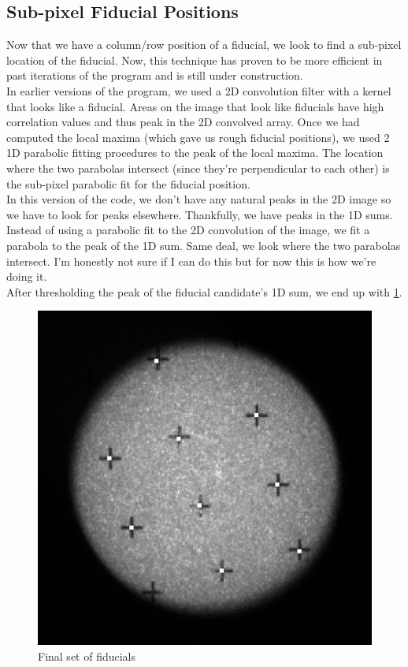 \documentclass[10pt]{scrartcl}
\begin{document}
\subsection{Sub-pixel Fiducial Positions} %
\label{sub:sub_pixel_fiducial_positions}

Now that we have a column/row position of a fiducial, we look to find a sub-pixel location of the fiducial. Now, this technique has proven to be more efficient in past iterations of the program and is still under construction.\\
\indent In earlier versions of the program, we used a 2D convolution filter with a kernel that looks like a fiducial. Areas on the image that look like fiducials have high correlation values and thus peak in the 2D convolved array. Once we had computed the local maxima (which gave us rough fiducial positions), we used 2 1D parabolic fitting procedures to the peak of the local maxima. The location where the two parabolas intersect (since they're perpendicular to each other) is the sub-pixel parabolic fit for the fiducial position.\\
\indent In this version of the code, we don't have any natural peaks in the 2D image so we have to look for peaks elsewhere. Thankfully, we have peaks in the 1D sums. Instead of using a parabolic fit to the 2D convolution of the image, we fit a parabola to the peak of the 1D sum. Same deal, we look where the two parabolas intersect. I'm honestly not sure if I can do this but for now this is how we're doing it.\\
\indent After thresholding the peak of the fiducial candidate's 1D sum, we end up with \cref{fiddone}.

\begin{figure}[!ht]
    \centering
    \includegraphics[width=.9\textwidth]{../plots_tables_images/fiddone.eps}
    \caption{Final set of fiducials}
    \label{fiddone}
\end{figure}
\end{document}
